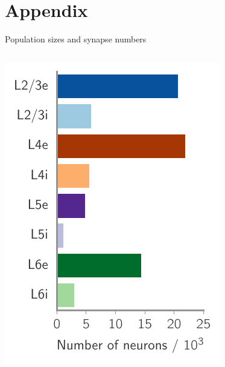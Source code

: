 \documentclass[xcolor=x11names,compress]{beamer}
\renewcommand{\(}{\begin{columns}}
\renewcommand{\)}{\end{columns}}
\newcommand{\<}[1]{\begin{column}{#1}}
\renewcommand{\>}{\end{column}}
\begin{document}
\section{Appendix}
\label{sec:appendix}

\begin{frame}[t]{Population sizes and synapse numbers}
    \begin{columns}[T] %
    \begin{column}[T]{5cm} %
        \includegraphics[width=1.0\linewidth]{../figures/population_size}
    \end{column}
    \begin{column}[T]{5cm} %

\end{column}
\end{columns}
\end{frame}
\end{document}
